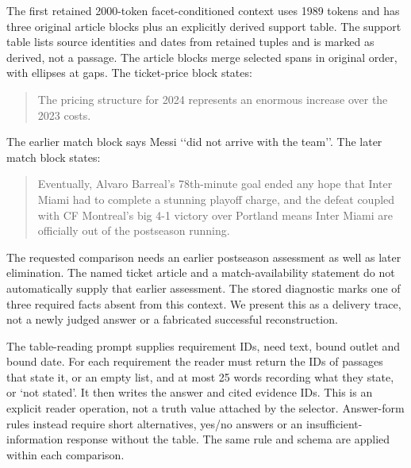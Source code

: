 The first retained 2000-token facet-conditioned context uses 1989 tokens and has three original article blocks plus an explicitly derived support table.
The support table lists source identities and dates from retained tuples and is marked as derived, not a passage.
The article blocks merge selected spans in original order, with ellipses at gaps.
The ticket-price block states:
\begin{quote}\small
The pricing structure for 2024 represents an enormous increase over the 2023 costs.
\end{quote}
The earlier match block says Messi \lq\lq did not arrive with the team\rq\rq.
The later match block states:
\begin{quote}\small
Eventually, Alvaro Barreal's 78th-minute goal ended any hope that Inter Miami had to complete a stunning playoff charge, and the defeat coupled with CF Montreal's big 4-1 victory over Portland means Inter Miami are officially out of the postseason running.
\end{quote}
The requested comparison needs an earlier postseason assessment as well as later elimination.
The named ticket article and a match-availability statement do not automatically supply that earlier assessment.
The stored diagnostic marks one of three required facts absent from this context.
We present this as a delivery trace, not a newly judged answer or a fabricated successful reconstruction.

The table-reading prompt supplies requirement IDs, need text, bound outlet and bound date.
For each requirement the reader must return the IDs of passages that state it, or an empty list, and at most 25 words recording what they state, or \lq not stated\rq.
It then writes the answer and cited evidence IDs.
This is an explicit reader operation, not a truth value attached by the selector.
Answer-form rules instead require short alternatives, yes/no answers or an insufficient-information response without the table.
The same rule and schema are applied within each comparison.

